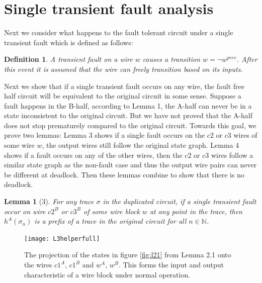 \documentclass[12pt]{report}
\newtheorem*{definition}{Definition}
\newtheorem*{lemma}{Lemma}
\begin{document}
\section{Single transient fault analysis}
Next we consider what happens to the fault tolerant circuit under a single transient fault which is defined as follows:
\begin{definition}A transient fault on a wire $w$ causes a transition $w= \lnot w^{prev}$.  After this event it is assumed that the wire can freely transition based on its inputs. %
\end{definition}
Next we show that if a single transient fault occurs on any wire, the fault free half circuit will be equivalent to the original circuit in some sense.  
Suppose a fault happens in the B-half, according to Lemma 1, the A-half can never be in a state inconsistent to the original circuit.  But we have not proved that the A-half does not stop prematurely compared to the original circuit.  Towards this goal, we prove two lemmas:  Lemma 3 shows if a single fault occurs on the $c2$ or $c3$ wires of some wire $w$, the output wires still follow the original state graph.  Lemma 4 shows if a fault occurs on any of the other wires, then the $c2$ or $c3$ wires follow a similar state graph as the non-fault case and thus the output wire pairs can never be different at deadlock.  Then these lemmas combine to show that there is no deadlock.


\begin{lemma}[3]
For any trace $\sigma$ in the duplicated circuit, if a single transient fault occur on wire $c2^B$ or $c3^B$ of some wire block $w$ at any point in the trace, then $h^{A}(\sigma_n)$ is a prefix of a trace in the original circuit for all $n \in \mathbb{N}$.
\end{lemma}
\begin{figure}
  \centering
    \texttt{[image: L3helperfull]}
  \caption{The projection of the states in figure \ref{fig:l21} from Lemma 2.1 onto the wires $c1^A$, $c1^B$ and $w^A$, $w^B$.  This forms the input and output characteristic of a wire block under normal operation.}
  \label{fig:l3helper}
\end{figure}
\end{document}
